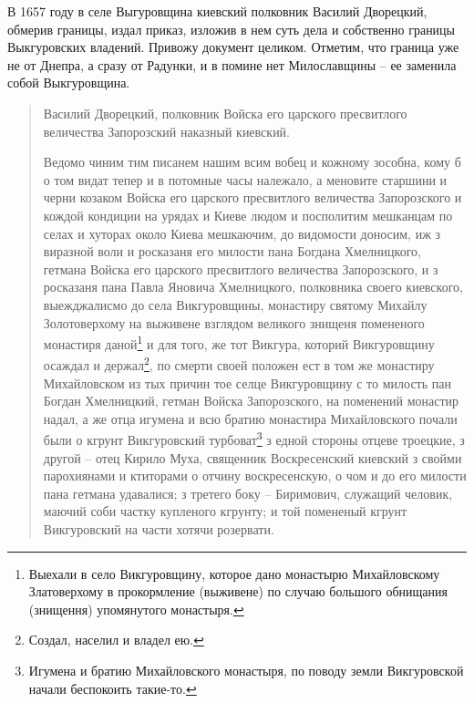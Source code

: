 В 1657 году в селе Выгуровщина киевский полковник Василий Дворецкий, обмерив границы, издал приказ, изложив в нем суть дела и собственно границы Выкгуровских владений. Привожу документ целиком\cite{mihdocs}. Отметим, что граница уже не от Днепра, а сразу от Радунки, и в помине нет Милославщины – ее заменила собой Выкгуровщина.

\begin{quotation}
Василий Дворецкий, полковник Войска его царского пресвитлого величества Запорозский наказный киевский.

Ведомо чиним тим писанем нашим всим вобец и кожному зособна, кому б о том видат тепер и в потомные часы належало, а меновите старшини и черни козаком Войска его царского пресвитлого величества Запорозского и кождой кондиции на урядах и Киеве людом и посполитим мешканцам по селах и хуторах около Киева мешкаючим, до видомости доносим, иж з виразной воли и росказаня его милости пана Богдана Хмелницкого, гетмана Войска его царского пресвитлого величества Запорозского, и з росказаня пана Павла Яновича Хмелницкого, полковника своего киевского, выежджалисмо до села Викгуровщины, монастиру святому Михайлу Золотоверхому на выживене взглядом великого знищеня помененого монастиря даной\footnote{Выехали в село Викгуровщину, которое дано монастырю Михайловскому Златоверхому в прокормление (выживене) по случаю большого обнищания (знищення) упомянутого монастыря.} и для того, же тот Викгура, которий Викгуровщину осаждал и держал\footnote{Создал, населил и владел ею.}, по смерти своей положен ест в том же монастиру Михайловском из тых причин тое селце Викгуровщину с то милость пан Богдан Хмелницкий, гетман Войска Запорозского, на поменений монастир надал, а же отца игумена и всю братию монастира Михайловского почали были о кгрунт Викгуровский турбоват\footnote{Игумена и братию Михайловского монастыря, по поводу земли Викгуровской начали беспокоить такие-то.} з едной стороны отцеве троецкие, з другой – отец Кирило Муха, священник Воскресенский киевский з свойми парохиянами и ктиторами о отчину воскресенскую, о чом и до его милости пана гетмана удавалися; з третего боку – Биримович, служащий человик, маючий соби частку купленого кгрунту; и той помененый кгрунт Викгуровский на части хотячи розервати.


\end{quotation}
